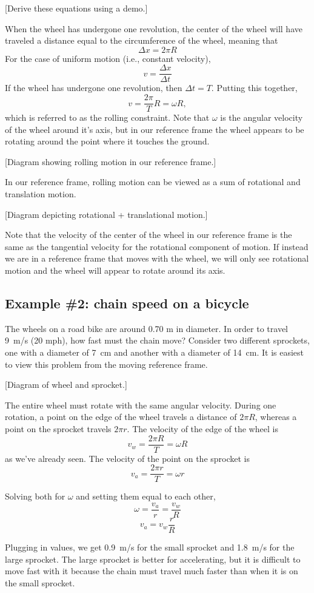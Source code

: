 [Derive these equations using a demo.]

When the wheel has undergone one revolution, the center of the wheel will have traveled a distance equal to the circumference of the wheel, meaning that
$$\Delta x = 2\pi R$$
For the case of uniform motion (i.e., constant velocity),
$$v = \frac{\Delta x}{\Delta t}$$
If the wheel has undergone one revolution, then $\Delta t = T$. Putting this together,
$$v = \frac{2\pi}{T}R = \omega R,$$
which is referred to as the rolling constraint. Note that $\omega$ is the angular velocity of the wheel around it's axis, but in our reference frame the wheel appears to be rotating around the point where it touches the ground.

[Diagram showing rolling motion in our reference frame.]
\vspace{3cm}

In our reference frame, rolling motion can be viewed as a sum of rotational and translation motion.

[Diagram depicting rotational + translational motion.]
\vspace{3cm}

Note that the velocity of the center of the wheel in our reference frame is the same as the tangential velocity for the rotational component of motion. If instead we are in a reference frame that moves with the wheel, we will only see rotational motion and the wheel will appear to rotate around its axis. 



\subsection{Example \#2: chain speed on a bicycle}
The wheels on a road bike are around 0.70 m in diameter. In order to travel 9~m/s (20 mph), how fast must the chain move? Consider two different sprockets, one with a diameter of 7~cm and another with a diameter of 14~cm. It is easiest to view this problem from the moving reference frame.

[Diagram of wheel and sprocket.]
\vspace{3cm}


The entire wheel must rotate with the same angular velocity. During one rotation, a point on the edge of the wheel travels a distance of $2\pi R$, whereas a point on the sprocket travels $2\pi r$. The velocity of the edge of the wheel is
$$v_w = \frac{2\pi R}{T} = \omega R$$
as we've already seen. The velocity of the point on the sprocket is
$$v_a = \frac{2\pi r}{T} = \omega r$$

Solving both for $\omega$ and setting them equal to each other,
$$\omega = \frac{v_a}{r} = \frac{v_w}{R}$$
$$v_a = v_w\frac{r}{R}$$

Plugging in values, we get 0.9~m/s for the small sprocket and 1.8~m/s for the large sprocket. The large sprocket is better for accelerating, but it is difficult to move fast with it because the chain must travel much faster than when it is on the small sprocket.



\clearpage
